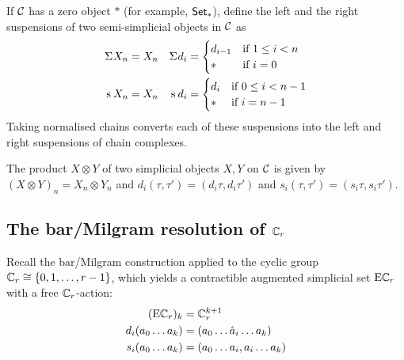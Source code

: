If $\mathcal{C}$ has a zero object $*$ (for example, $\mathsf{Set}_*$), define the left and the right suspensions of two semi-simplicial objects in $\mathcal{C}$ as
\begin{align*}
	\Sigma^{} X_n &= X_n & \Sigma^{}d_i &= \begin{cases} d_{i-1} & \text{if $1\leq i<n$} \\
		\ast & \text{if $i=0$}
	\end{cases}
	\\
	\operatorname{s}^{} X_n &= X_n & \operatorname{s}^{}d_i &= \begin{cases} d_i & \text{if $0\leq i<n-1$} \\
		\ast & \text{if $i=n-1$}
	\end{cases}
\end{align*}
Taking normalised chains converts each of these suspensions into the left and right suspensions of chain complexes.

The product $X\otimes Y$ of two simplicial objects $X,Y$ on $\mathcal{C}$ is given by $(X\otimes Y)_n = X_n\otimes Y_n$ and $d_i(\tau,\tau') = (d_i\tau,d_i\tau')$ and $s_i(\tau,\tau') = (s_i\tau,s_i\tau')$.

\subsection{The bar/Milgram resolution of $\mathbb{C}_r$}

Recall the bar/Milgram construction applied to the cyclic group $\mathbb{C}_r\cong \{0,1,\ldots,r-1\}$, which yields a contractible augmented simplicial set $\mathrm{E}\mathbb{C}_r$ with a free $\mathbb{C}_r$-action:
\begin{align*}
	(\mathrm{E}\mathbb{C}_r)_k &= \mathbb{C}_r^{k+1}\\
	d_i(a_0\ldots a_k) &= (a_0\ldots\hat{a}_i\ldots a_k) \\
	s_i(a_0\ldots a_k) &= (a_0\ldots a_i,a_i\ldots a_k)
\end{align*}
